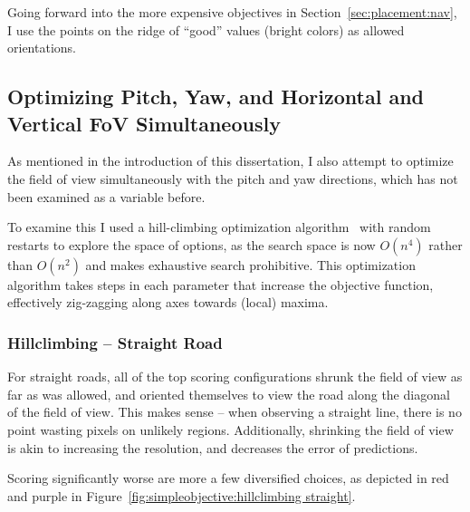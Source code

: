 \documentclass[a4paper,12pt,twoside,openright]{report}
\begin{document}
Going forward into the more expensive objectives in Section~\ref{sec:placement:nav}, I use the
points on the ridge of ``good'' values (bright colors) as allowed orientations.



\subsection{Optimizing Pitch, Yaw, and Horizontal and Vertical FoV Simultaneously}
\label{sec:simpleobjective:hillclimbing}

As mentioned in the introduction of this dissertation, I also attempt
to optimize the field of view simultaneously with the pitch and yaw
directions, which has not been examined as a variable before.

To examine this I used a hill-climbing optimization algorithm~\cite{russell2016artificial}
with random restarts to explore the space of options, as the search
space is now $O(n^4)$ rather than $O(n^2)$ and makes exhaustive search prohibitive. This optimization algorithm
takes steps in each parameter that increase the objective function, effectively
zig-zagging along axes towards (local) maxima.

\subsubsection{Hillclimbing -- Straight Road}

For straight roads, all of the top scoring configurations 
shrunk the field of view as far as was allowed, and oriented themselves to
view the road along the diagonal of the field of view. This makes sense -- 
when observing a straight line, there is no point wasting pixels
on unlikely regions. Additionally, shrinking the field
of view is akin to increasing the resolution, and decreases
the error of predictions. 

Scoring significantly worse are more a few diversified choices,
as depicted in red and purple in Figure~\ref{fig:simpleobjective:hillclimbing straight}.
\end{document}

